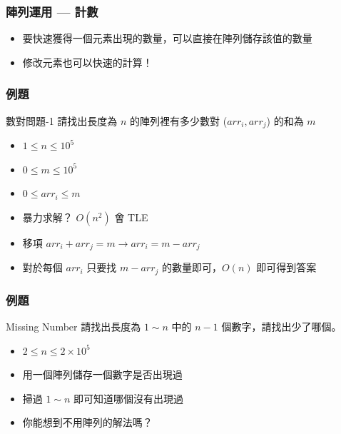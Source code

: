 \documentclass[mathserif]{beamer}
\begin{document}
\begin{frame}
    \frametitle{陣列運用 — 計數}
    \begin{itemize}
        \item 要快速獲得一個元素出現的數量，可以直接在陣列儲存該值的數量
        \item 修改元素也可以快速的計算！
    \end{itemize}
\end{frame}

\begin{frame}
    \frametitle{例題}
    \begin{block}{數對問題-1}
        請找出長度為 $n$ 的陣列裡有多少數對 ($arr_i, arr_j$) 的和為 $m$
        \vspace{0.5cm}
        \begin{itemize}
            \item $1 \leq n \leq 10^5$
            \item $0 \leq m \leq 10^5$
            \item $0 \leq arr_i \leq m$
        \end{itemize}
    \end{block}

    \begin{itemize}
        \item<2-> 暴力求解？ $O(n^2)$ 會 TLE
        \item<3-> 移項 $arr_i+arr_j=m \rightarrow arr_i=m-arr_j$
        \item<3-> 對於每個 $arr_i$ 只要找 $m-arr_j$ 的數量即可，$O(n)$ 即可得到答案
    \end{itemize}
\end{frame}

\begin{frame}
    \frametitle{例題}
    \begin{block}{Missing Number}
        請找出長度為 $1 \sim n$ 中的 $n-1$ 個數字，請找出少了哪個。
        \vspace{0.5cm}
        \begin{itemize}
            \item $2 \leq n \leq 2 \times 10^5$
        \end{itemize}
    \end{block}

    \begin{itemize}
        \item<2-> 用一個陣列儲存一個數字是否出現過
        \item<2-> 掃過 $1 \sim n$ 即可知道哪個沒有出現過
        \item<3-> 你能想到不用陣列的解法嗎？
    \end{itemize}
\end{frame}
\end{document}
